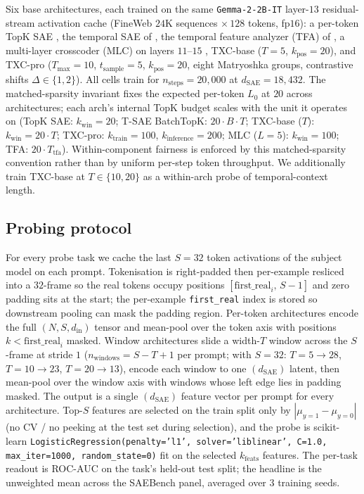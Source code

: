 Six base architectures, each trained on the same \texttt{Gemma-2-2B-IT} layer-$13$ residual-stream activation cache (FineWeb $24$K sequences $\times\,128$ tokens, fp$16$): a per-token TopK SAE \cite{gao2024scaling}, the temporal SAE of \citet{bhalla2025tsae}, the temporal feature analyzer (TFA) of \citet{lubana2025priors}, a multi-layer crosscoder (MLC) on layers $11$--$15$ \cite{lindsey2024sparsecrosscoders}, TXC-base ($T = 5$, $k_{\mathrm{pos}} = 20$), and TXC-pro ($T_{\max} = 10$, $t_{\mathrm{sample}} = 5$, $k_{\mathrm{pos}} = 20$, eight Matryoshka groups, contrastive shifts $\Delta \in \{1, 2\}$). All cells train for $n_{\mathrm{steps}} = 20{,}000$ at $d_{\mathrm{SAE}} = 18{,}432$. The matched-sparsity invariant fixes the expected per-token $L_0$ at $20$ across architectures; each arch's internal TopK budget scales with the unit it operates on (TopK SAE: $k_{\mathrm{win}} = 20$; T-SAE BatchTopK: $20\cdot B \cdot T$; TXC-base ($T$): $k_{\mathrm{win}} = 20\cdot T$; TXC-pro: $k_{\mathrm{train}} = 100$, $k_{\mathrm{inference}} = 200$; MLC ($L = 5$): $k_{\mathrm{win}} = 100$; TFA: $20\cdot T_{\mathrm{tfa}}$). Within-component fairness is enforced by this matched-sparsity convention rather than by uniform per-step token throughput. We additionally train TXC-base at $T \in \{10, 20\}$ as a within-arch probe of temporal-context length.

\subsection{Probing protocol}
\label{app:c3-protocol}

For every probe task we cache the last $S = 32$ token activations of the subject model on each prompt. Tokenisation is right-padded then per-example resliced into a $32$-frame so the real tokens occupy positions $[\text{first\_real}_i,\,S-1]$ and zero padding sits at the start; the per-example \texttt{first\_real} index is stored so downstream pooling can mask the padding region. Per-token architectures encode the full $(N, S, d_{\mathrm{in}})$ tensor and mean-pool over the token axis with positions $k < \text{first\_real}_i$ masked. Window architectures slide a width-$T$ window across the $S$-frame at stride $1$ ($n_{\mathrm{windows}} = S - T + 1$ per prompt; with $S = 32$: $T=5\!\to\!28$, $T=10\!\to\!23$, $T=20\!\to\!13$), encode each window to one $(d_{\mathrm{SAE}})$ latent, then mean-pool over the window axis with windows whose left edge lies in padding masked. The output is a single $(d_{\mathrm{SAE}})$ feature vector per prompt for every architecture. Top-$S$ features are selected on the train split only by $|\mu_{y=1} - \mu_{y=0}|$ (no CV / no peeking at the test set during selection), and the probe is scikit-learn \texttt{LogisticRegression(penalty='l1', solver='liblinear', C=1.0, max\_iter=1000, random\_state=0)} fit on the selected $k_{\mathrm{feats}}$ features. The per-task readout is ROC-AUC on the task's held-out test split; the headline is the unweighted mean across the SAEBench panel, averaged over $3$ training seeds.

